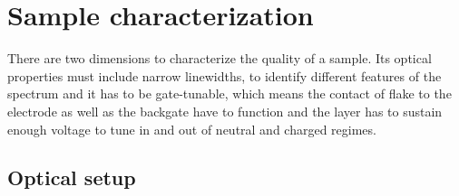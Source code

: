 \chapter{Sample characterization}

There are two dimensions to characterize the quality of a sample. Its optical properties must include narrow linewidths, to identify different features of the spectrum and it has to be gate-tunable, which means the contact of \tmdg flake to the electrode as well as the backgate have to function and the \sio layer has to sustain enough voltage to tune in and out of neutral and charged regimes.

\section{Optical setup}

